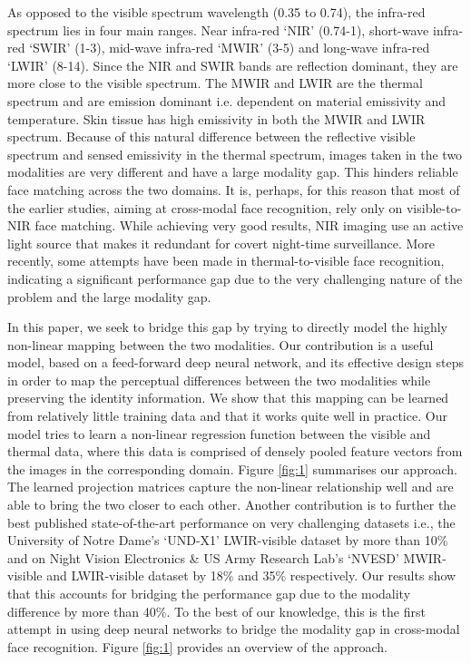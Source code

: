 \documentclass[smallextended,natbib]{svjour3}       \usepackage{graphicx}
\begin{document}
As opposed to the visible spectrum wavelength (0.35 to 0.74), the infra-red spectrum lies in four main ranges. Near infra-red `NIR' (0.74-1), short-wave infra-red `SWIR' (1-3), mid-wave infra-red `MWIR' (3-5) and long-wave infra-red `LWIR' (8-14). Since the NIR and SWIR bands are reflection dominant, they are more close to the visible spectrum. The MWIR and LWIR are the thermal spectrum and are emission dominant i.e. dependent on material emissivity and temperature. Skin tissue has high emissivity in both the MWIR and LWIR spectrum. Because of this natural difference between the reflective visible spectrum and sensed emissivity in the thermal spectrum, images taken in the two modalities are very different and have a large modality gap. This hinders reliable face matching across the two domains. It is, perhaps, for this reason that most of the earlier studies, aiming at cross-modal face recognition, rely only on visible-to-NIR face matching. While achieving very good results, NIR imaging use an active light source that makes it redundant for covert night-time surveillance. More recently, some attempts have been made in thermal-to-visible face recognition, indicating a significant performance gap due to the very challenging nature of the problem and the large modality gap.

In this paper, we seek to bridge this gap by trying to directly model the highly non-linear mapping between the two modalities. Our contribution is a useful model, based on a feed-forward deep neural network, and its effective design steps in order to map the perceptual differences between the two modalities while preserving the identity information. We show that this mapping can be learned from relatively little training data and that it works quite well in practice. Our model tries to learn a non-linear regression function between the visible and thermal data, where this data is comprised of densely pooled feature vectors from the images in the corresponding domain. Figure \ref{fig:1} summarises our approach. The learned projection matrices capture the non-linear relationship well and are able to bring the two closer to each other. Another contribution is to further the best published state-of-the-art performance on very challenging datasets i.e., the University of Notre Dame's `UND-X1' LWIR-visible dataset by more than 10\% and on Night Vision Electronics \& US Army Research Lab's `NVESD' MWIR-visible and LWIR-visible dataset by 18\% and 35\% respectively. Our results show that this accounts for bridging the performance gap due to the modality difference by more than 40\%. To the best of our knowledge, this is the first attempt in using deep neural networks to bridge the modality gap in cross-modal face recognition. Figure \ref{fig:1} provides an overview of the approach. 
\end{document}
